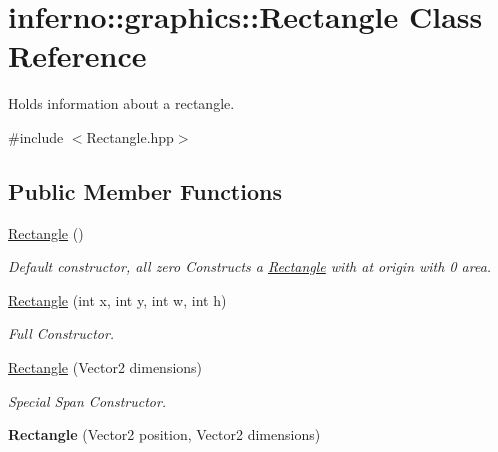 \hypertarget{classinferno_1_1graphics_1_1_rectangle}{}\section{inferno\+:\+:graphics\+:\+:Rectangle Class Reference}
\label{classinferno_1_1graphics_1_1_rectangle}


Holds information about a rectangle.  




{\ttfamily \#include $<$Rectangle.\+hpp$>$}

\subsection*{Public Member Functions}
\begin{DoxyCompactItemize}
\item 
\mbox{\hyperlink{classinferno_1_1graphics_1_1_rectangle_ab60df3580f0cc0fd5a24bd8ec5783933}{Rectangle}} ()
\begin{DoxyCompactList}\small\item\em Default constructor, all zero Constructs a \mbox{\hyperlink{classinferno_1_1graphics_1_1_rectangle}{Rectangle}} with at origin with 0 area. \end{DoxyCompactList}\item 
\mbox{\hyperlink{classinferno_1_1graphics_1_1_rectangle_a6abc478421b60e8549d44a2640aba2e8}{Rectangle}} (int x, int y, int w, int h)
\begin{DoxyCompactList}\small\item\em Full Constructor. \end{DoxyCompactList}\item 
\mbox{\hyperlink{classinferno_1_1graphics_1_1_rectangle_a814df936f602eadf641dc5ac323b6408}{Rectangle}} (Vector2 dimensions)
\begin{DoxyCompactList}\small\item\em Special Span Constructor. \end{DoxyCompactList}\item 
\mbox{\label{classinferno_1_1graphics_1_1_rectangle_a86d6d0d63fc14106594210473037255a}} 
{\bfseries Rectangle} (Vector2 position, Vector2 dimensions)
\item 
\mbox{\label{classinferno_1_1graphics_1_1_rectangle_ad4a2b10b3b75379efcc808bc7be1d855}} 

\end{DoxyCompactItemize}
